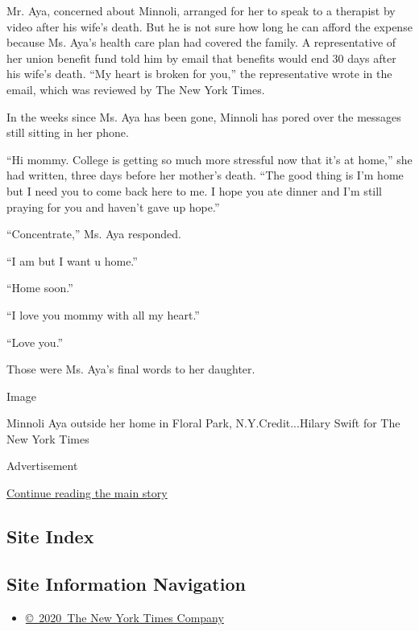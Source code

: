 Mr. Aya, concerned about Minnoli, arranged for her to speak to a
therapist by video after his wife's death. But he is not sure how long
he can afford the expense because Ms. Aya's health care plan had covered
the family. A representative of her union benefit fund told him by email
that benefits would end 30 days after his wife's death. ``My heart is
broken for you,'' the representative wrote in the email, which was
reviewed by The New York Times.

In the weeks since Ms. Aya has been gone, Minnoli has pored over the
messages still sitting in her phone.

``Hi mommy. College is getting so much more stressful now that it's at
home,'' she had written, three days before her mother's death. ``The
good thing is I'm home but I need you to come back here to me. I hope
you ate dinner and I'm still praying for you and haven't gave up hope.''

``Concentrate,'' Ms. Aya responded.

``I am but I want u home.''

``Home soon.''

``I love you mommy with all my heart.''

``Love you.''

Those were Ms. Aya's final words to her daughter.

Image

Minnoli Aya outside her home in Floral Park, N.Y.Credit...Hilary Swift
for The New York Times

Advertisement

\protect\hyperlink{after-bottom}{Continue reading the main story}

\hypertarget{site-index}{%
\subsection{Site Index}\label{site-index}}

\hypertarget{site-information-navigation}{%
\subsection{Site Information
Navigation}\label{site-information-navigation}}

\begin{itemize}
\tightlist
\item
  \href{https://help.nytimes3xbfgragh.onion/hc/en-us/articles/115014792127-Copyright-notice}{©~2020~The
  New York Times Company}
\end{itemize}

